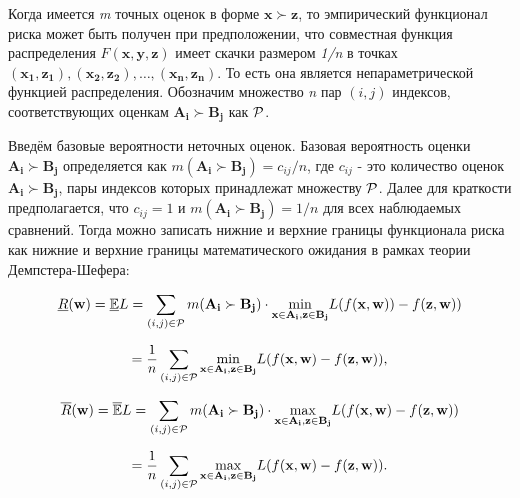 \documentclass[12pt,a4paper,oneside]{article}
\begin{document}
\par 
Когда имеется \emph{m} точных оценок в форме \(\mathbf{x} \succ \mathbf{z}\), то эмпирический функционал риска может быть получен при предположении, что совместная функция распределения \(F(\mathbf{x}, \mathbf{y}, \mathbf{z})\) имеет скачки размером \emph{1/n} в точках \((\mathbf{x_1}, \mathbf{z_1}), (\mathbf{x_2}, \mathbf{z_2}), \dots, (\mathbf{x_n}, \mathbf{z_n})\). 
То есть она является непараметрической функцией распределения. 
Обозначим множество \emph{n} пар \((i, j)\) индексов, соответствующих оценкам \(\mathbf{A_i} \succ \mathbf{B_j}\) как \(\mathcal{P}\). 

\par
Введём базовые вероятности неточных оценок. 
Базовая вероятность оценки \(\mathbf{A_i} \succ \mathbf{B_j}\) определяется как \(m(\mathbf{A_i} \succ \mathbf{B_j}) = c_{ij} / n\), где \(c_{ij}\) - это количество оценок \(\mathbf{A_i} \succ \mathbf{B_j}\), пары индексов которых принадлежат множеству \(\mathcal{P}\). 
Далее для краткости предполагается, что \(c_{ij} = 1\) и \(m(\mathbf{A_i} \succ \mathbf{B_j}) = 1/n\) для всех наблюдаемых сравнений. 
Тогда можно записать нижние и верхние границы функционала риска как нижние и верхние границы математического ожидания в рамках теории Демпстера-Шефера:

\[
\underline{R}(\mathbf{w}) = \mathbb{\underline{E}}L = \sum \limits_{(i,j) \in \Rho} m(\mathbf{A_i} \succ \mathbf{B_j}) \cdot \underset{%
	\mathbf{x} \in \mathbf{A_i}, \mathbf{z} \in \mathbf{B_j}%
}{\operatorname{min}} %
L(f(\mathbf{x}, \mathbf{w})) - f(\mathbf{z}, \mathbf{w}))
\]

\[
= \frac{1}{n} \sum \limits_{(i,j) \in \Rho} \underset{%
\mathbf{x} \in \mathbf{A_i}, \mathbf{z} \in \mathbf{B_j}%
}{\operatorname{min}}%
L(f(\mathbf{x}, \mathbf{w}) - f(\mathbf{z}, \mathbf{w})),
\]

\[
\overline{R}(\mathbf{w}) = \mathbb{\overline{E}} L = \sum \limits_{(i,j) \in \Rho} m(\mathbf{A_i} \succ \mathbf{B_j}) \cdot \underset{%
	\mathbf{x} \in \mathbf{A_i}, \mathbf{z} \in \mathbf{B_j}%
}{\operatorname{max}}
L (f (\mathbf{x}, \mathbf{w}) - f(\mathbf{z}, \mathbf{w}))
\]

\[
= \frac{1}{n} \sum \limits_{(i,j) \in \Rho} \underset{%
	\mathbf{x} \in \mathbf{A_i}, \mathbf{z} \in \mathbf{B_j}%
}{\operatorname{max}}%
L (f(\mathbf{x}, \mathbf{w}) - f(\mathbf{z}, \mathbf{w})).
\]
\end{document}
